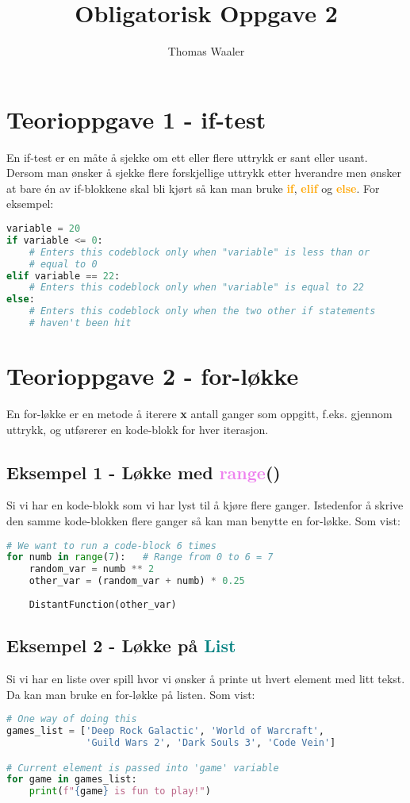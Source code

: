 \documentclass[10pt,a4paper]{article}
\author{Thomas Waaler}
\title{Obligatorisk Oppgave 2}
\begin{document}
\maketitle


\section*{Teorioppgave 1 - if-test}
En if-test er en måte å sjekke om ett eller flere uttrykk er sant eller usant.
Dersom man ønsker å sjekke flere forskjellige uttrykk etter hverandre men ønsker at bare én av if-blokkene skal bli kjørt så kan man bruke \textcolor{orange}{\textbf{if}}, \textcolor{orange}{\textbf{elif}} og \textcolor{orange}{\textbf{else}}. For eksempel:

\begin{lstlisting}[language=Python]
variable = 20
if variable <= 0:
	# Enters this codeblock only when "variable" is less than or
	# equal to 0
elif variable == 22:
	# Enters this codeblock only when "variable" is equal to 22
else:
	# Enters this codeblock only when the two other if statements
	# haven't been hit
\end{lstlisting}


\section*{Teorioppgave 2 - for-løkke}
En for-løkke er en metode å iterere \textbf{x} antall ganger som oppgitt, f.eks. gjennom uttrykk, og utførerer en kode-blokk for hver iterasjon.

\subsection*{Eksempel 1 - Løkke med \textcolor{violet}{\textbf{range}}()}
Si vi har en kode-blokk som vi har lyst til å kjøre flere ganger. Istedenfor å skrive den samme kode-blokken flere ganger så kan man benytte en for-løkke. Som vist:
\begin{lstlisting}[language=Python]
# We want to run a code-block 6 times
for numb in range(7):	# Range from 0 to 6 = 7
	random_var = numb ** 2
	other_var = (random_var + numb) * 0.25
	
	DistantFunction(other_var)
\end{lstlisting}

\subsection*{Eksempel 2 - Løkke på \textcolor{teal}{List}}
Si vi har en liste over spill hvor vi ønsker å printe ut hvert element med litt tekst. Da kan man bruke en for-løkke på listen. Som vist:
\begin{lstlisting}[language=Python]
# One way of doing this
games_list = ['Deep Rock Galactic', 'World of Warcraft', 
			  'Guild Wars 2', 'Dark Souls 3', 'Code Vein']

# Current element is passed into 'game' variable
for game in games_list: 
	print(f"{game} is fun to play!")
\end{lstlisting}
\end{document}
